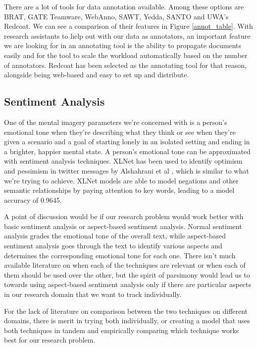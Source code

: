 \documentclass[12pt, a4paper]{article}
\begin{document}
There are a lot of tools for data annotation available. Among these options are BRAT, GATE Teamware, WebAnno, SAWT, Yedda, SANTO and UWA's Redcoat. We can see a comparison of their features in Figure \ref{annot_table}. With research assistants to help out with our data as annotators, an important feature we are looking for in an annotating tool is the ability to propagate documents easily and for the tool to scale the workload automatically based on the number of annotators.  Redcoat \cite{stewart-etal-2019-redcoat} has been selected as the annotating tool for that reason, alongside being web-based and easy to set up and distribute. 

\subsection{Sentiment Analysis}
One of the mental imagery parameters we're concerned with is a person's emotional tone when they're describing what they think or see when they're given a scenario and a goal of starting lonely in an isolated setting and ending in a brighter, happier mental state. A person's emotional tone can be approximated with sentiment analysis techniques. XLNet has been used to identify optimism and pessimism in twitter messages by Alshahrani et al \cite{alshahrani2019xlnet}, which is similar to what we're trying to achieve. XLNet models are able to model negations and other semantic relationships by paying attention to key words, leading to a model accuracy of 0.9645. 

A point of discussion would be if our research problem would work better with basic sentiment analysis or aspect-based sentiment analysis. Normal sentiment analysis grades the emotional tone of the overall text, while aspect-based sentiment analysis goes through the text to identify various aspects and determines the corresponding emotional tone for each one. There isn't much available literature on when each of the techniques are relevant or when each of them should be used over the other, but the spirit of parsimony would lead us to towards using aspect-based sentiment analysis only if there are particular aspects in our research domain that we want to track individually. 

For the lack of literature on comparison between the two techniques on different domains, there is merit in trying both individually, or creating a model that uses both techniques in tandem and empirically comparing which technique works best for our research problem.
\end{document}
